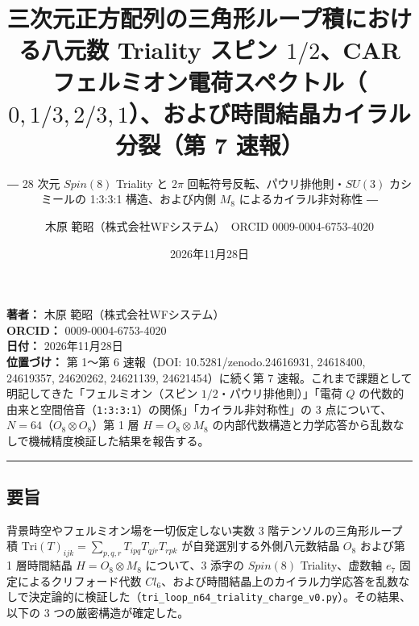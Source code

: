 \documentclass[
  a4paper,
]{ltjsarticle}
\title{三次元正方配列の三角形ループ積における八元数 Triality スピン
\(1/2\)、CAR
フェルミオン電荷スペクトル（\(0, 1/3, 2/3, 1\)）、および時間結晶カイラル分裂（第
7 速報）}
\subtitle{― 28 次元 \(Spin(8)\) Triality と \(2\pi\)
回転符号反転、パウリ排他則・\(SU(3)\) カシミールの 1:3:3:1
構造、および内側 \(M_8\) によるカイラル非対称性 ―}
\author{木原 範昭（株式会社WFシステム）　ORCID 0009-0004-6753-4020}
\date{2026年11月28日}
\begin{document}
\maketitle

\textbf{著者：} 木原 範昭（株式会社WFシステム）\\
\textbf{ORCID：} 0009-0004-6753-4020\\
\textbf{日付：} 2026年11月28日\\
\textbf{位置づけ：} 第 1〜第 6 速報（DOI: 10.5281/zenodo.24616931,
24618400, 24619357, 24620262, 24621139, 24621454）に続く第 7
速報。これまで課題として明記してきた「フェルミオン（スピン
\(1/2\)・パウリ排他則）」「電荷 \(Q\)
の代数的由来と空間倍音（\texttt{1:3:3:1}）の関係」「カイラル非対称性」の
3 点について、\(N = 64\)（\(O_8 \otimes O_8\)）第 1 層
\(H = O_8 \otimes M_8\)
の内部代数構造と力学応答から乱数なしで機械精度検証した結果を報告する。

\begin{center}\rule{0.5\linewidth}{0.5pt}\end{center}

\subsection{要旨}\label{ux8981ux65e8}

背景時空やフェルミオン場を一切仮定しない実数 3
階テンソルの三角形ループ積
\(\mathrm{Tri}(T)_{ijk} = \sum_{p,q,r} T_{ipq} T_{qjr} T_{rpk}\)
が自発選別する外側八元数結晶 \(O_8\) および第 1 層時間結晶
\(H = O_8 \otimes M_8\) について、3 添字の \(Spin(8)\) Triality、虚数軸
\(e_7\) 固定によるクリフォード代数
\(Cl_6\)、および時間結晶上のカイラル力学応答を乱数なしで決定論的に検証した（\texttt{tri\_loop\_n64\_triality\_charge\_v0.py}）。その結果、以下の
3 つの厳密構造が確定した。
\end{document}
